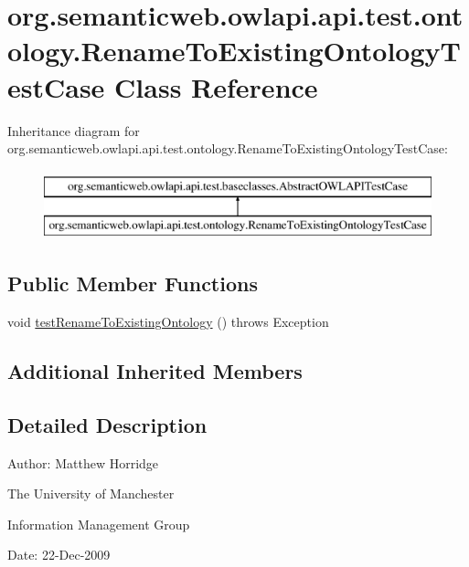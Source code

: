 \hypertarget{classorg_1_1semanticweb_1_1owlapi_1_1api_1_1test_1_1ontology_1_1_rename_to_existing_ontology_test_case}{\section{org.\-semanticweb.\-owlapi.\-api.\-test.\-ontology.\-Rename\-To\-Existing\-Ontology\-Test\-Case Class Reference}
\label{classorg_1_1semanticweb_1_1owlapi_1_1api_1_1test_1_1ontology_1_1_rename_to_existing_ontology_test_case}
}
Inheritance diagram for org.\-semanticweb.\-owlapi.\-api.\-test.\-ontology.\-Rename\-To\-Existing\-Ontology\-Test\-Case\-:\begin{figure}[H]
\begin{center}
\leavevmode
\includegraphics[height=2.000000cm]{classorg_1_1semanticweb_1_1owlapi_1_1api_1_1test_1_1ontology_1_1_rename_to_existing_ontology_test_case}
\end{center}
\end{figure}
\subsection*{Public Member Functions}
\begin{DoxyCompactItemize}
\item 
void \hyperlink{classorg_1_1semanticweb_1_1owlapi_1_1api_1_1test_1_1ontology_1_1_rename_to_existing_ontology_test_case_af42ad305e2688bde69915fda3bc0850d}{test\-Rename\-To\-Existing\-Ontology} ()  throws Exception 
\end{DoxyCompactItemize}
\subsection*{Additional Inherited Members}


\subsection{Detailed Description}
Author\-: Matthew Horridge\par
 The University of Manchester\par
 Information Management Group\par
 Date\-: 22-\/\-Dec-\/2009 

